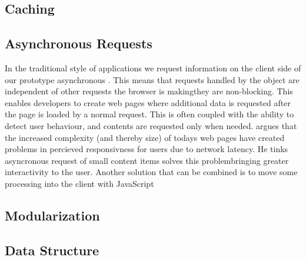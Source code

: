 \subsection{Caching}

\subsection{Asynchronous Requests}

In the traditional style of  applications we request information on
the client side of our prototype asynchronous%
.
This means that requests handled by the  object
are independent of other requests the browser is making\dash{}they
are non-blocking. This enables developers to create web pages where additional
data is requested after the page is loaded by a normal  request.
This is often coupled with the ability to detect user behaviour, and contents
are requested only when needed. \citet[pp.281--282]{stamey06} argues that
the increased complexity (and thereby size) of todays web pages have created
problems in percieved responsivness for users due to network latency. He
tinks asyncronous request of small content items solves this
problem\dash{}bringing greater interactivity to the user. Another solution
that can be combined is to move some processing into the client with
JavaScript \citep[p.~9]{jazayeri07}

\subsection{Modularization}


\subsection{Data Structure}
